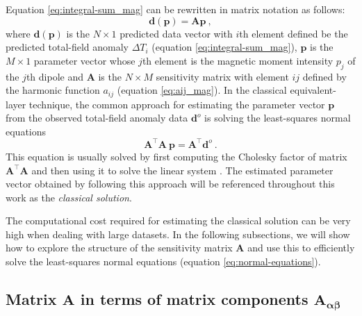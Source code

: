 Equation \ref{eq:integral-sum_mag} can be rewritten in matrix notation as follows:
\begin{equation}
\mathbf{d}(\mathbf{p}) = \mathbf{A} \mathbf{p} \: ,
\label{eq:predicted-data-vector_mag}
\end{equation}
where $\mathbf{d}(\mathbf{p})$ is the $N \times 1$ predicted data vector with $i$th element defined
be the predicted total-field anomaly $\Delta T_{i}$ (equation \ref{eq:integral-sum_mag}),
$\mathbf{p}$ is the $M \times 1$ parameter vector whose $j$th element is the magnetic moment intensity
$p_{j}$ of the $j$th dipole and $\mathbf{A}$ is the $N \times M$ sensitivity matrix with element 
$ij$ defined by the harmonic function $a_{ij}$ (equation \ref{eq:aij_mag}).
In the classical equivalent-layer technique, the common approach for 
estimating the parameter vector $\mathbf{p}$ from the observed 
total-field anomaly data $\mathbf{d}^{o}$ is solving the least-squares normal equations
\begin{equation}
\mathbf{A}^{\top}\mathbf{A} \: \mathbf{p} = 
\mathbf{A}^{\top} \mathbf{d}^{o} \: .
\label{eq:normal-equations}
\end{equation}
This equation is usually solved by first computing the Cholesky factor of matrix
$\mathbf{A}^{\top}\mathbf{A}$ and then using it to solve the linear system
\citep[][ p. 262]{golub-vanloan2013}. 
The estimated parameter vector obtained by following this approach will be 
referenced throughout this work as the \textit{classical solution}.

The computational cost required for estimating the classical solution can be very high
when dealing with large datasets. In the following subsections, we will show how to 
explore the structure of the sensitivity matrix $\mathbf{A}$ and use this to
efficiently solve the least-squares normal equations (equation \ref{eq:normal-equations}).


\subsection{Matrix $\mathbf{A}$ in terms of matrix components $\mathbf{A_{\boldsymbol{\alpha\beta}}}$}


